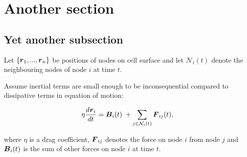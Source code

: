 \section{Another section}

\subsection{Yet another subsection}

\begin{frame}{\insertsubsectionhead}

  Let \( \left \lbrace \boldsymbol{r}_1, ..., \boldsymbol{r}_n \right \rbrace \) be 
    positions of nodes on cell surface and 
    let \( \mathcal{N}_i(t) \) denote 
    the neighbouring nodes of 
    node \( i \) at time \( t \). 

	\vspace*{12pt}
  
  Assume inertial terms are small enough to be 
    inconsequential compared to
    dissipative terms 
    in equation of motion:

	\begin{align*}
		\eta \frac{d^{} {\boldsymbol{r}_i}} {d{t}^{}} = \boldsymbol{B}_i(t)\; + 
			\sum_{j\in \mathcal{N}_{i}(t)} \boldsymbol{F}_{i j}(t),
  \end{align*}
  
  where \( \eta \) is a drag coefficient, 
    \(\boldsymbol{F}_{i j}\) denotes the force on node \(i\) from node \(j\) and 
    \(\boldsymbol{B}_i(t)\) is the sum of other forces on node \(i\) at time \(t\).	

\end{frame}